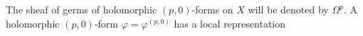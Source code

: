 The sheaf of germs of holomorphic $(p, 0)$-forms on $X$ will be denoted by $\Omega^p$. A holomorphic $(p, 0)$-form $\varphi = \varphi^{(p, 0)}$ has a local representation

